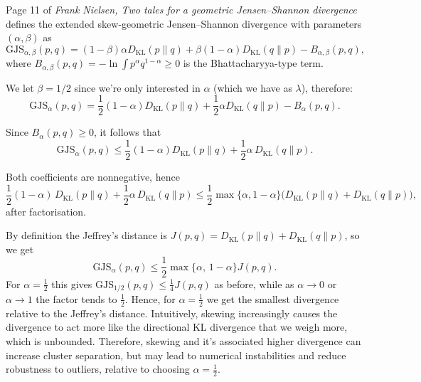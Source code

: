 \documentclass{article}
\begin{document}

Page 11 of \textit{Frank Nielsen, Two tales for a geometric Jensen–Shannon divergence} defines the extended skew-geometric Jensen–Shannon divergence with parameters $(\alpha,\beta)$ as
\[
\mathrm{GJS}_{\alpha,\beta}(p,q)
= (1-\beta)\alpha D_{\mathrm{KL}}(p\|q) + \beta(1-\alpha) D_{\mathrm{KL}}(q\|p) - B_{\alpha,\beta}(p,q),
\]
where $B_{\alpha,\beta}(p,q)=-\ln \int p^\alpha q^{1-\alpha}\ge 0$ is the Bhattacharyya-type term.

We let $\beta = 1/2$ since we're only interested in $\alpha$ (which we have as $\lambda$), therefore:
\[
\mathrm{GJS}_{\alpha}(p,q)
= \frac{1}{2}(1-\alpha)D_{\mathrm{KL}}(p\|q) +\frac{1}{2}\alpha D_{\mathrm{KL}}(q\|p)-B_\alpha(p,q).
\]

Since $B_\alpha(p,q)\ge 0$, it follows that
\[
\mathrm{GJS}_{\alpha}(p,q) \le \frac{1}{2}(1-\alpha)D_{\mathrm{KL}}(p\|q) + \frac{1}{2}\alpha\,D_{\mathrm{KL}}(q\|p).
\]

Both coefficients are nonnegative, hence
\[
\frac{1}{2}(1-\alpha)\,D_{\mathrm{KL}}(p\|q) + \frac{1}{2}\alpha\,D_{\mathrm{KL}}(q\|p)
\le \frac{1}{2} \max\{\alpha,1-\alpha\}\big(D_{\mathrm{KL}}(p\|q)+D_{\mathrm{KL}}(q\|p)\big),
\]
after factorisation.

By definition the Jeffrey's distance is $J(p,q)=D_{\mathrm{KL}}(p\|q)+D_{\mathrm{KL}}(q\|p)$, so we get
\[
\mathrm{GJS}_\alpha(p,q) \le \frac{1}{2}\max\{\alpha,\,1-\alpha\}J(p,q).
\]
For $\alpha=\frac{1}{2}$ this gives $\mathrm{GJS}_{1/2}(p,q)\le \frac{1}{4} J(p,q)$ as before, while as $\alpha\to 0$ or $\alpha\to 1$ the factor tends to $\frac{1}{2}$.
Hence, for $\alpha = \frac{1}{2}$ we get the smallest divergence relative to the Jeffrey's distance. 
Intuitively, skewing increasingly causes the divergence to act more like the directional KL divergence that we weigh more, which is unbounded. 
Therefore, skewing and it's associated higher divergence can increase cluster separation, but may lead to numerical instabilities and reduce robustness to outliers, relative to choosing $\alpha = \frac{1}{2}$.
\end{document}
